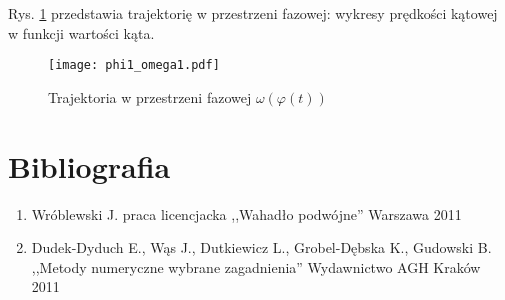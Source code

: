 \documentclass[11pt]{aghdpl}
\begin{document}
Rys. \ref{phi_omega} przedstawia trajektorię w przestrzeni fazowej: wykresy prędkości kątowej w funkcji wartości kąta.
\begin{figure}[t]
	\centering
	\label{phi_omega}
	\texttt{[image: phi1\_omega1.pdf]}
	\caption{Trajektoria w przestrzeni fazowej 
	$\omega(\varphi(t))$
	}
\end{figure}


\section{Bibliografia}
\begin{enumerate}[1]
\item Wróblewski J. praca licencjacka ,,Wahadło podwójne'' Warszawa 2011 \label{bib_one}
\item Dudek-Dyduch E., Wąs J., Dutkiewicz L., Grobel-Dębska K., Gudowski B. ,,Metody numeryczne wybrane zagadnienia'' Wydawnictwo AGH Kraków 2011 \label{bib_two}

\end{enumerate}
\end{document}
